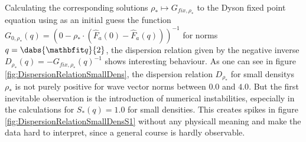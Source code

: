 Calculating the corresponding solutions $\rho_*\mapsto G_{\mathit{fix},\rho_*}$ to the Dyson fixed point equation using as an initial guess the function $G_{0,\rho_*}(q) = (0 - \rho_*\cdot(\hat F_a(0) - \hat F_a(q)))^{-1}$ for norms $q= \dabs{\vq}{2}$, the dispersion relation given by the negative inverse $D_{\rho_*}(q) = -G_{\mathit{fix},\rho_*}(q)^{-1}$ shows interesting behaviour. As one can see in figure \ref{fig:DispersionRelationSmallDens}, the dispersion relation $D_{\rho_*}$ for small densitys $\rho_*$ is not purely positive for wave vector norms between $0.0$ and $4.0$.
But the first inevitable observation is the introduction of numerical instabilities, especially in the calculations for $S_*(q) = 1.0$ for small densities. This creates spikes in figure \ref{fig:DispersionRelationSmallDensS1} without any physicall meaning and make the data hard to interpret, since a general course is hardly observable. 

